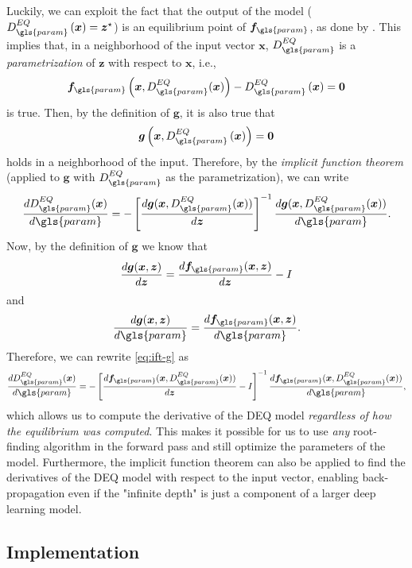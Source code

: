 Luckily, we can exploit the fact that the output of the model ($D^{EQ}_{\gls{param}}\left( \bm{x} \right) = \bm{z}^{\star}$) is an equilibrium point of $\bm{f}_{\gls{param}}$, as done by \textcite{Bai2019}.
This implies that, in a neighborhood of the input vector $\bm{x}$, $D^{EQ}_{\gls{param}}$ is a \emph{parametrization} of $\bm{z}$ with respect to $\bm{x}$, i.e., \[
    \bm{f}_{\gls{param}}\left( \bm{x},D^{EQ}_{\gls{param}}(\bm{x}) \right) -D^{EQ}_{\gls{param}}\left( \bm{x} \right) = \bm{0}
\] is true. Then, by the definition of $\bm{g}$, it is also true that \[
\bm{g}\left( \bm{x}, D^{EQ}_{\gls{param}}\left( \bm{x} \right) \right) = \bm{0}
\] holds in a neighborhood of the input.
Therefore, by the \emph{implicit function theorem} (applied to $\bm{g}$ with $D^{EQ}_{\gls{param}}$ as the parametrization), we can write
\begin{equation}\label{eq:ift-g}
    \frac{d D^{EQ}_{\gls{param}}(\bm{x})}{d \gls{param}} = - \left[ \frac{d \bm{g}(\bm{x}, D^{EQ}_{\gls{param}}(\bm{x}))}{d \bm{z}} \right]^{-1} \frac{d \bm{g}(\bm{x}, D^{EQ}_{\gls{param}}(\bm{x}))}{d \gls{param}}
.\end{equation}
Now, by the definition of $\bm{g}$ we know that \[
    \frac{d \bm{g}(\bm{x}, \bm{z})}{d \bm{z}} = \frac{d \bm{f}_{\gls{param}}(\bm{x},\bm{z})}{d \bm{z}} - I 
\] and \[
\frac{d \bm{g}(\bm{x}, \bm{z})}{d \gls{param}} = \frac{d \bm{f}_{\gls{param}}(\bm{x},\bm{z})}{d \gls{param}}
.\] Therefore, we can rewrite \eqref{eq:ift-g} as
\begin{equation}\label{eq:deq-jacobian}
    \frac{d D^{EQ}_{\gls{param}}(\bm{x})}{d \gls{param}} = - \left[ \frac{d \bm{f}_{\gls{param}}(\bm{x},D^{EQ}_{\gls{param}}(\bm{x}))}{d \bm{z}} - I \right]^{-1} \frac{d \bm{f}_{\gls{param}}(\bm{x},D^{EQ}_{\gls{param}}(\bm{x}))}{d \gls{param}}
,\end{equation}
which allows us to compute the derivative of the \gls{DEQ} model \emph{regardless of how the equilibrium was computed}.
This makes it possible for us to use \emph{any} root-finding algorithm in the forward pass and still optimize the parameters of the model.
Furthermore, the implicit function theorem can also be applied to find the derivatives of the DEQ model with respect to the input vector, enabling back-propagation even if the "infinite depth" is just a component of a larger deep learning model.

\subsection{Implementation}\label{sec:deq-backward-implementation}

